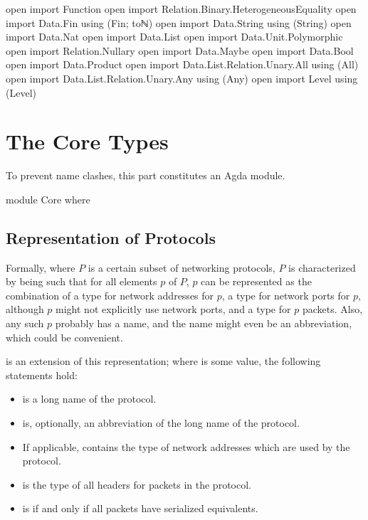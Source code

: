 \documentclass{report}
\begin{document}
\begin{code}
open import Function
open import Relation.Binary.HeterogeneousEquality
open import Data.Fin using (Fin; toℕ)
open import Data.String using (String)
open import Data.Nat
open import Data.List
open import Data.Unit.Polymorphic
open import Relation.Nullary
open import Data.Maybe
open import Data.Bool
open import Data.Product
open import Data.List.Relation.Unary.All using (All)
open import Data.List.Relation.Unary.Any using (Any)
open import Level using (Level)
\end{code}

\part{The Core Types}
To prevent name clashes, this part constitutes an Agda module.

\begin{code}
module Core where
\end{code}

\chapter{Representation of Protocols}
Formally, where \(P\) is a certain subset of networking protocols, \(P\) is characterized by being such that for all elements \(p\) of \(P\), \(p\) can be represented as the combination of a type for network addresses for \(p\), a type for network ports for \(p\), although \(p\) might not explicitly use network ports, and a type for \(p\) packets.  Also, any such \(p\) probably has a name, and the name might even be an abbreviation, which could be convenient.

 is an extension of this representation; where  is some   value, the following statements hold:
\begin{itemize}
  \item {}  is a long name of the  protocol.
  \item {}  is, optionally, an abbreviation of the long name of the  protocol.
  \item If applicable,   contains the type of network addresses which are used by the  protocol.
  \item {}  is the type of all headers for packets in the  protocol.
  \item {}  is  if and only if all  packets have serialized equivalents.
\end{itemize}
\end{document}

